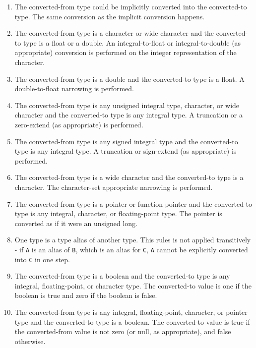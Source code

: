 \documentclass[letterpaper,12pt]{book}
\begin{document}
\begin{enumerate}
	\item The converted-from type could be implicitly converted into the converted-to type. The same conversion as the implicit conversion happens.
	
	\item The converted-from type is a character or wide character and the converted-to type is a float or a double. An integral-to-float or integral-to-double (as appropriate) conversion is performed on the integer representation of the character.
	
	\item The converted-from type is a double and the converted-to type is a float. A double-to-float narrowing is performed.
	
	\item The converted-from type is any unsigned integral type, character, or wide character and the converted-to type is any integral type. A truncation or a zero-extend (as appropriate) is performed.
	
	\item The converted-from type is any signed integral type and the converted-to type is any integral type. A truncation or sign-extend (as appropriate) is performed.
	
	\item The converted-from type is a wide character and the converted-to type is a character. The character-set appropriate narrowing is performed.
	
	\item The converted-from type is a pointer or function pointer and the converted-to type is any integral, character, or floating-point type. The pointer is converted as if it were an unsigned long.
	
	\item One type is a type alias of another type. This rules is not applied transitively - if \texttt{A} is an alias of \texttt{B}, which is an alias for \texttt{C}, \texttt{A} cannot be explicitly converted into \texttt{C} in one step.
	
	\item The converted-from type is a boolean and the converted-to type is any integral, floating-point, or character type. The converted-to value is one if the boolean is true and zero if the boolean is false.
	
	\item The converted-from type is any integral, floating-point, character, or pointer type and the converted-to type is a boolean. The converted-to value is true if the converted-from value is not zero (or null, as appropriate), and false otherwise.
	

\end{enumerate}
\end{document}
